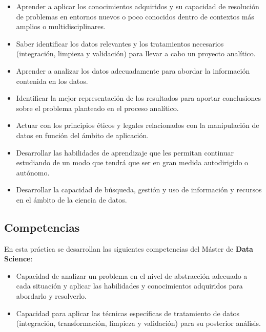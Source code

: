 \documentclass[]{article}
\providecommand{\tightlist}{%
  \setlength{\itemsep}{0pt}\setlength{\parskip}{0pt}}
\begin{document}
\begin{itemize}
\tightlist
\item
  Aprender a aplicar los conocimientos adquiridos y su capacidad de
  resolución de problemas en entornos nuevos o poco conocidos dentro de
  contextos más amplios o multidisciplinares.\\
\item
  Saber identificar los datos relevantes y los tratamientos necesarios
  (integración, limpieza y validación) para llevar a cabo un proyecto
  analítico.\\
\item
  Aprender a analizar los datos adecuadamente para abordar la
  información contenida en los datos.\\
\item
  Identificar la mejor representación de los resultados para aportar
  conclusiones sobre el problema planteado en el proceso analítico.\\
\item
  Actuar con los principios éticos y legales relacionados con la
  manipulación de datos en función del ámbito de aplicación.\\
\item
  Desarrollar las habilidades de aprendizaje que les permitan continuar
  estudiando de un modo que tendrá que ser en gran medida autodirigido o
  autónomo.\\
\item
  Desarrollar la capacidad de búsqueda, gestión y uso de información y
  recursos en el ámbito de la ciencia de datos.
\end{itemize}

\subsection{Competencias}\label{competencias}

En esta práctica se desarrollan las siguientes competencias del Máster
de \textbf{Data Science}:

\begin{itemize}
\tightlist
\item
  Capacidad de analizar un problema en el nivel de abstracción adecuado
  a cada situación y aplicar las habilidades y conocimientos adquiridos
  para abordarlo y resolverlo.
\item
  Capacidad para aplicar las técnicas específicas de tratamiento de
  datos (integración, transformación, limpieza y validación) para su
  posterior análisis.
\end{itemize}
\end{document}
